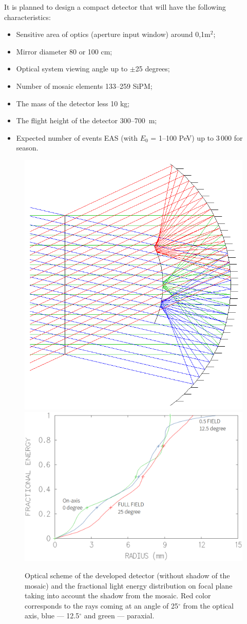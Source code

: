 \documentclass[a4paper,11pt]{article}
\begin{document}
It is planned to design a compact detector that will have the following characteristics:

\begin{itemize}
\item Sensitive area of optics (aperture input window) around 0,1m$^2$;
\item Mirror diameter 80 or 100 cm;
\item Optical system viewing angle up to $\pm$25 degrees;
\item Number of mosaic elements 133--259 SiPM;
\item The mass of the detector less 10 kg;
\item The flight height of the detector 300--700~m;
\item Expected number of events EAS (with $E_0$ = 1--100 PeV) up to 3\,000 for season.
\end{itemize}

\begin{figure}[bt]
\centering %
\includegraphics[width=.32\textwidth,clip]{Sphere3optic.png}
\qquad
\includegraphics[width=.48\textwidth]{Sphere3spot_energy.png}
\caption{Optical scheme of the developed detector (without shadow of the mosaic) and the fractional light energy distribution on focal plane taking into account the shadow from the mosaic. Red color corresponds to the rays coming at an angle of 25$^\circ$ from the optical axis, blue --- 12.5$^\circ$ and green --- paraxial.}
\label{fig:optic_sphere3}
\end{figure}
\end{document}
